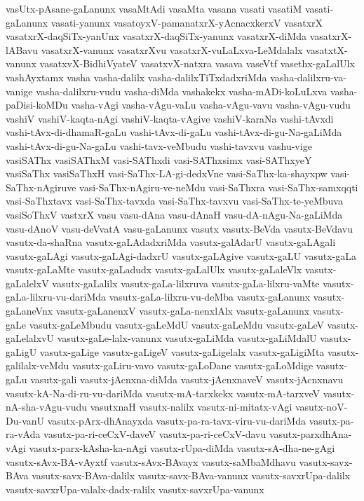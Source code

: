 {vasUtx-pAsane-gaLanunx
vasaMtAdi
vasaMta
vasana
vasati
vasatiM
vasati-gaLanunx
vasati-yanunx
vasatoyxV-pamanatxrX-yAcnacxkerxV
vasatxrX
vasatxrX-daqSiTx-yanUnx
vasatxrX-daqSiTx-yanunx
vasatxrX-diMda
vasatxrX-lABavu
vasatxrX-vanunx
vasatxrXvu
vasatxrX-vuLaLxva-LeMdalalx
vasatxtX-vanunx
vasatxvX-BidhiVyateV
vasatxvX-natxra
vasava
vaseVtf
vasethx-gaLalUlx
vashAyxtamx
vasha
vasha-dalilx
vasha-dalilxTiTxdadxriMda
vasha-dalilxru-va-vanige
vasha-dalilxru-vudu
vasha-diMda
vashakekx
vasha-mADi-koLuLxva
vasha-paDisi-koMDu
vasha-vAgi
vasha-vAgu-vaLu
vasha-vAgu-vavu
vasha-vAgu-vudu
vashiV
vashiV-kaqta-nAgi
vashiV-kaqta-vAgive
vashiV-karaNa
vashi-tAvxdi
vashi-tAvx-di-dhamaR-gaLu
vashi-tAvx-di-gaLu
vashi-tAvx-di-gu-Na-gaLiMda
vashi-tAvx-di-gu-Na-gaLu
vashi-tavx-veMbudu
vashi-tavxvu
vashu-vige
vasiSAThx
vasiSAThxM
vasi-SAThxdi
vasi-SAThxsimx
vasi-SAThxyeY
vasiSaThx
vasiSaThxH
vasi-SaThx-LA-gi-dedxVne
vasi-SaThx-ka-shayxpw
vasi-SaThx-nAgiruve
vasi-SaThx-nAgiru-ve-neMdu
vasi-SaThxra
vasi-SaThx-samxqqti
vasi-SaThxtavx
vasi-SaThx-tavxda
vasi-SaThx-tavxvu
vasi-SaThx-te-yeMbuva
vasiSoThxV
vastxrX
vasu
vasu-dAna
vasu-dAnaH
vasu-dA-nAgu-Na-gaLiMda
vasu-dAnoV
vasu-deVvatA
vasu-gaLanunx
vasutx
vasutx-BeVda
vasutx-BeVdavu
vasutx-da-shaRna
vasutx-gaLAdadxriMda
vasutx-galAdarU
vasutx-gaLAgali
vasutx-gaLAgi
vasutx-gaLAgi-dadxrU
vasutx-gaLAgive
vasutx-gaLU
vasutx-gaLa
vasutx-gaLaMte
vasutx-gaLadudx
vasutx-gaLalUlx
vasutx-gaLaleVlx
vasutx-gaLalelxV
vasutx-gaLalilx
vasutx-gaLa-lilxruva
vasutx-gaLa-lilxru-vaMte
vasutx-gaLa-lilxru-vu-dariMda
vasutx-gaLa-lilxru-vu-deMba
vasutx-gaLanunx
vasutx-gaLaneVnx
vasutx-gaLanenxV
vasutx-gaLa-nenxlAlx
vasutx-gaLanunx
vasutx-gaLe
vasutx-gaLeMbudu
vasutx-gaLeMdU
vasutx-gaLeMdu
vasutx-gaLeV
vasutx-gaLelalxvU
vasutx-gaLe-lalx-vanunx
vasutx-gaLiMda
vasutx-gaLiMdalU
vasutx-gaLigU
vasutx-gaLige
vasutx-gaLigeV
vasutx-gaLigelalx
vasutx-gaLigiMta
vasutx-galilalx-veMdu
vasutx-gaLiru-vavo
vasutx-gaLoDane
vasutx-gaLoMdige
vasutx-gaLu
vasutx-gali
vasutx-jAcnxna-diMda
vasutx-jAcnxnaveV
vasutx-jAcnxnavu
vasutx-kA-Na-di-ru-vu-dariMda
vasutx-mA-tarxkekx
vasutx-mA-tarxveV
vasutx-nA-sha-vAgu-vudu
vasutxnaH
vasutx-nalilx
vasutx-ni-mitatx-vAgi
vasutx-noV-Du-vanU
vasutx-pArx-dhAnayxda
vasutx-pa-ra-tavx-viru-vu-dariMda
vasutx-pa-ra-vAda
vasutx-pa-ri-ceCxV-daveV
vasutx-pa-ri-ceCxV-davu
vasutx-parxdhAna-vAgi
vasutx-parx-kAsha-ka-nAgi
vasutx-rUpa-diMda
vasutx-sA-dha-ne-gAgi
vasutx-sAvx-BA-vAyxtf
vasutx-sAvx-BAvayx
vasutx-saMbaMdhavu
vasutx-savx-BAva
vasutx-savx-BAva-dalilx
vasutx-savx-BAva-vanunx
vasutx-savxrUpa-dalilx
vasutx-savxrUpa-valalx-dadx-ralilx
vasutx-savxrUpa-vanunx
}
